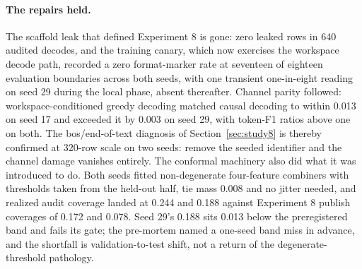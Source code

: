 \documentclass[10pt,a4paper]{article}
\begin{document}
\paragraph{The repairs held.}
The scaffold leak that defined Experiment 8 is gone: zero leaked rows in 640
audited decodes, and the training canary, which now exercises the workspace
decode path, recorded a zero format-marker rate at seventeen of eighteen
evaluation boundaries across both seeds, with one transient one-in-eight
reading on seed 29 during the local phase, absent thereafter. Channel parity
followed: workspace-conditioned greedy decoding matched causal decoding to
within 0.013 on seed 17 and exceeded it by 0.003 on seed 29, with token-F1
ratios above one on both. The bos/end-of-text diagnosis of
Section~\ref{sec:study8} is thereby confirmed at 320-row scale on two seeds:
remove the seeded identifier and the channel damage vanishes entirely. The
conformal machinery also did what it was introduced to do. Both seeds fitted
non-degenerate four-feature combiners with thresholds taken from the held-out
half, tie mass 0.008 and no jitter needed, and realized audit coverage landed
at 0.244 and 0.188 against Experiment 8 publish coverages of 0.172 and 0.078.
Seed 29's 0.188 sits 0.013 below the preregistered band and fails its gate;
the pre-mortem named a one-seed band miss in advance, and the shortfall is
validation-to-test shift, not a return of the degenerate-threshold pathology.
\end{document}
